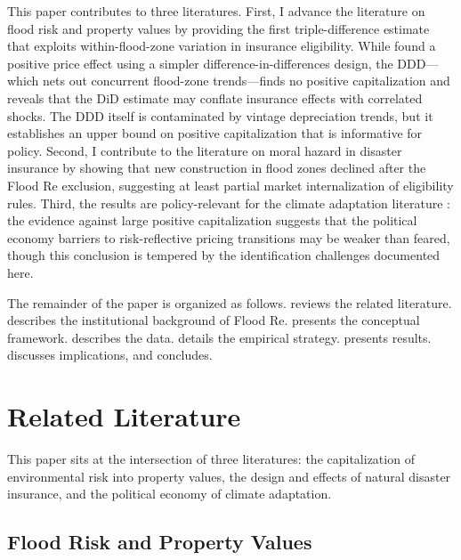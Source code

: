 \documentclass[12pt]{article}
\begin{document}
This paper contributes to three literatures. First, I advance the literature on flood risk and property values \citep{bin2004flood, bernstein2019disaster, murfin2020climate, barrage2017flood, mayson2024flood} by providing the first triple-difference estimate that exploits within-flood-zone variation in insurance eligibility. While \citet{garbarino2024effect} found a positive price effect using a simpler difference-in-differences design, the DDD---which nets out concurrent flood-zone trends---finds no positive capitalization and reveals that the DiD estimate may conflate insurance effects with correlated shocks. The DDD itself is contaminated by vintage depreciation trends, but it establishes an upper bound on positive capitalization that is informative for policy. Second, I contribute to the literature on moral hazard in disaster insurance \citep{hudson2020moral, browne2000effect, kunreuther2015risk} by showing that new construction in flood zones declined after the Flood Re exclusion, suggesting at least partial market internalization of eligibility rules. Third, the results are policy-relevant for the climate adaptation literature \citep{depietri2022flood, deryugina2017fiscal}: the evidence against large positive capitalization suggests that the political economy barriers to risk-reflective pricing transitions may be weaker than feared, though this conclusion is tempered by the identification challenges documented here.

The remainder of the paper is organized as follows.  reviews the related literature.  describes the institutional background of Flood Re.  presents the conceptual framework.  describes the data.  details the empirical strategy.  presents results.  discusses implications, and  concludes.


\section{Related Literature}
\label{sec:literature}

This paper sits at the intersection of three literatures: the capitalization of environmental risk into property values, the design and effects of natural disaster insurance, and the political economy of climate adaptation.

\subsection{Flood Risk and Property Values}
\end{document}
